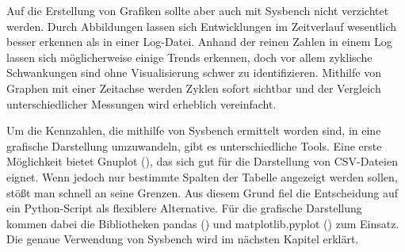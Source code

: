Auf die Erstellung von Grafiken sollte aber auch mit Sysbench nicht verzichtet werden.
Durch Abbildungen lassen sich Entwicklungen im Zeitverlauf wesentlich besser erkennen als in einer Log-Datei.
Anhand der reinen Zahlen in einem Log lassen sich möglicherweise einige Trends erkennen, doch vor allem zyklische Schwankungen sind ohne Visualisierung schwer zu identifizieren.
Mithilfe von Graphen mit einer Zeitachse werden Zyklen sofort sichtbar und der Vergleich unterschiedlicher Messungen wird erheblich vereinfacht.

Um die Kennzahlen, die mithilfe von Sysbench ermittelt worden sind, in eine grafische Darstellung umzuwandeln, gibt es unterschiedliche Tools.
Eine erste Möglichkeit bietet Gnuplot (\cite{gnuplot}), das sich gut für die Darstellung von CSV-Dateien eignet.
Wenn jedoch nur bestimmte Spalten der Tabelle angezeigt werden sollen, stößt man schnell an seine Grenzen.
Aus diesem Grund fiel die Entscheidung auf ein Python-Script als flexiblere Alternative.
Für die grafische Darstellung kommen dabei die Bibliotheken pandas (\cite{reback2020pandas}) und matplotlib.pyplot (\cite{hunter_2007}) zum Einsatz.
Die genaue Verwendung von Sysbench wird im nächsten Kapitel erklärt.